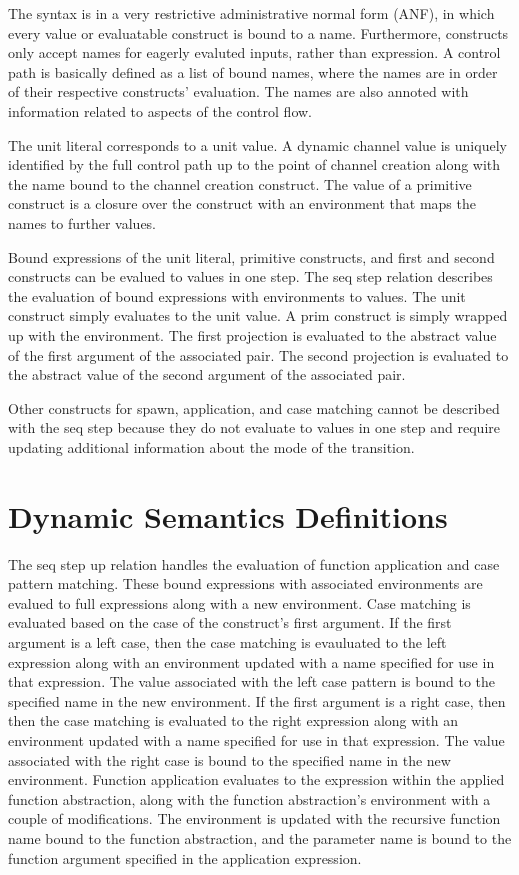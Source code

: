 \documentclass{article}
\begin{document}
The syntax is in a very restrictive administrative normal form (ANF), in which every value or
evaluatable construct is bound to a name.  Furthermore, constructs only accept names for
eagerly evaluted inputs, rather than expression.  A control path is basically defined as a list
of bound names, where the names are in order of their respective constructs' evaluation. The
names are also annoted with information related to aspects of the control flow. 


The unit literal corresponds to a unit value. A dynamic channel value is uniquely identified by
the full control path up to the point of channel creation along with the name bound to the
channel creation construct. The value of a primitive construct is a closure over the construct
with an environment that maps the names to further values.

Bound expressions of the unit literal, primitive constructs, and first and second constructs
can be evalued to values in one step.  The seq step relation describes the evaluation of bound
expressions with environments to values.  The unit construct simply evaluates to the unit
value.  A prim construct is simply wrapped up with the environment.  The first projection is
evaluated to the abstract value of the first argument of the associated pair. The second
projection is evaluated to the abstract value of the second argument of the associated pair.

Other constructs for spawn, application, and case matching cannot be described with the seq
step because they do not evaluate to values in one step and require updating additional
information about the mode of the transition. 

\section{Dynamic Semantics Definitions}

The seq step up relation handles the evaluation of function application and case pattern
matching.  These bound expressions with associated environments are evalued to full expressions
along with a new environment.  Case matching is evaluated based on the case of the construct's
first argument.  If the first argument is a left case, then the case matching is evauluated to
the left expression along with an environment updated with a name specified for use in that
expression.  The value associated with the left case pattern is bound to the specified name in
the new environment. If the first argument is a right case, then then the case matching is
evaluated to the right expression along with an environment updated with a name specified for
use in that expression.  The value associated with the right case is bound to the specified
name in the new environment. Function application evaluates to the expression within the
applied function abstraction, along with the function abstraction's environment with a couple
of modifications.  The environment is updated with the recursive function name bound to the
function abstraction, and the parameter name is bound to the function argument specified in the
application expression. 
\end{document}
